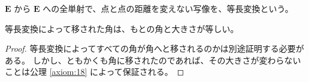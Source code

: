 \begin{dfn}\label{defintion:29}
  \(\bm{E}\) から \(\bm{E}\) への全単射で、点と点の距離を変えない写像を、等長変換という。
\end{dfn}

\begin{thm}\label{theorem:37}
 等長変換によって移された角は、もとの角と大きさが等しい。
\end{thm}

\begin{proof}
  等長変換によってすべての角が角へと移されるのかは別途証明する必要がある。
  しかし、ともかくも角に移されたのであれば、その大きさが変わらないことは公理 \ref{axiom:18} によって保証される。
\end{proof}
